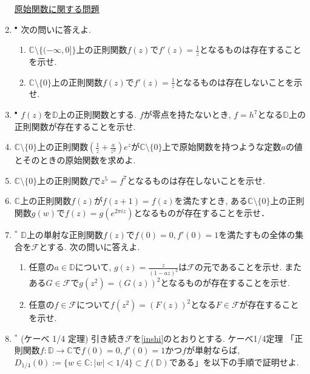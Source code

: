 \documentclass[dvipdfmx,a4paper,11pt]{article}
\newcommand{\C}{\mathbb{C}}
\newcommand{\D}{\mathbb{D}}
\theoremstyle{definition}
\begin{document}
\begin{enumerate}[label=\textbf{問}8.\arabic*]
\hspace{-36pt}\underline{原始関数に関する問題}


\item $^{\bullet}$ 
次の問いに答えよ.
\vspace{-12pt}
   \begin{enumerate}
\setlength{\parskip}{0cm} 
  \setlength{\itemsep}{0cm} 
 \item $\C \setminus \{ ( -\infty, 0]\}$上の正則関数$f(z)$で$f'(z) = \frac{1}{z}$となるものは存在することを示せ.
\item $\C \setminus \{ 0\}$上の正則関数$f(z)$で$f'(z) = \frac{1}{z}$となるものは存在しないことを示せ.
  \end{enumerate}

\item $^{\bullet}$  $f(z)$を$\D$上の正則関数とする. $f$が零点を持たないとき, $f = h^7$となる$\D$上の正則関数が存在することを示せ.



\item  $\C \setminus \{ 0\}$上の正則関数$( \frac{1}{z} + \frac{a}{z^3})e^z$が$\C \setminus \{ 0\}$上で原始関数を持つような定数$a$の値とそのときの原始関数を求めよ. 

\item $\C \setminus \{ 0\}$上の正則関数$f$で$z^5 = f^7$となるものは存在しないことを示せ. 

\item $\C$上の正則関数$f(z)$が$f(z+1)=f(z)$を満たすとき, ある$\C \setminus \{ 0\}$上の正則関数$g(w)$で$f(z) = g(e^{2 \pi i z})$となるものが存在することを示せ． 

\item  $^{*}$ \label{inshi} $\D$上の単射な正則関数$f(z)$で$f(0)=0, f'(0)=1$を満たすもの全体の集合を$\mathcal{F}$とする. 
次の問いに答えよ.
\vspace{-8pt}
   \begin{enumerate}
\setlength{\parskip}{0cm} 
  \setlength{\itemsep}{0cm} 
  \item 任意の$a \in \D$について, $g(z) = \frac{z}{(1 - az)^2}$は$\mathcal{F}$の元であることを示せ. またある$G \in \mathcal {F}$で$g(z^2) = (G(z))^2$となるものが存在することを示せ. 
  \item 任意の$f \in \mathcal{F}$について$f(z^2) = (F(z))^2$となる$F \in \mathcal{F}$が存在することを示せ. 
      \end{enumerate} 
      
 \item $^{*}$ (ケーべ 1/4 定理) 引き続き$\mathcal{F}$を\ref{inshi}のとおりとする. ケーべ1/4定理 「正則関数$f : \D \to \C$で$f(0)=0, f'(0)=1$かつ$f$が単射ならば, $D_{1/4}(0):=\{w \in \C : |w| <  1/4\} \subset f(\D)$である」を以下の手順で証明せよ.


\end{enumerate}
\end{document}
